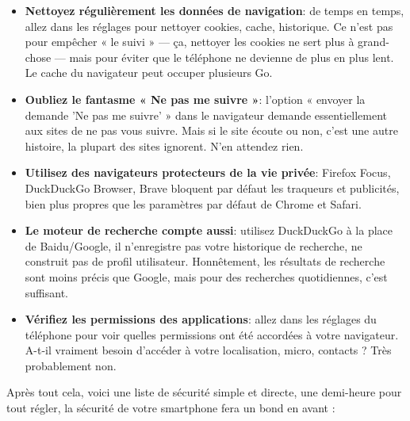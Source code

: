 \begin{itemize}
  \item \textbf{Nettoyez régulièrement les données de navigation}: de temps en temps, allez dans les réglages pour nettoyer cookies, cache, historique. Ce n'est pas pour empêcher « le suivi » — ça, nettoyer les cookies ne sert plus à grand-chose — mais pour éviter que le téléphone ne devienne de plus en plus lent. Le cache du navigateur peut occuper plusieurs Go.
  \item \textbf{Oubliez le fantasme « Ne pas me suivre »}: l'option « envoyer la demande 'Ne pas me suivre' » dans le navigateur demande essentiellement aux sites de ne pas vous suivre. Mais si le site écoute ou non, c'est une autre histoire, la plupart des sites ignorent. N'en attendez rien.
  \item \textbf{Utilisez des navigateurs protecteurs de la vie privée}: Firefox Focus, DuckDuckGo Browser, Brave bloquent par défaut les traqueurs et publicités, bien plus propres que les paramètres par défaut de Chrome et Safari.
  \item \textbf{Le moteur de recherche compte aussi}: utilisez DuckDuckGo à la place de Baidu/Google, il n'enregistre pas votre historique de recherche, ne construit pas de profil utilisateur. Honnêtement, les résultats de recherche sont moins précis que Google, mais pour des recherches quotidiennes, c'est suffisant.
  \item \textbf{Vérifiez les permissions des applications}: allez dans les réglages du téléphone pour voir quelles permissions ont été accordées à votre navigateur. A-t-il vraiment besoin d'accéder à votre localisation, micro, contacts ? Très probablement non.
\end{itemize}


Après tout cela, voici une liste de sécurité simple et directe, une demi-heure pour tout régler, la sécurité de votre smartphone fera un bond en avant :

